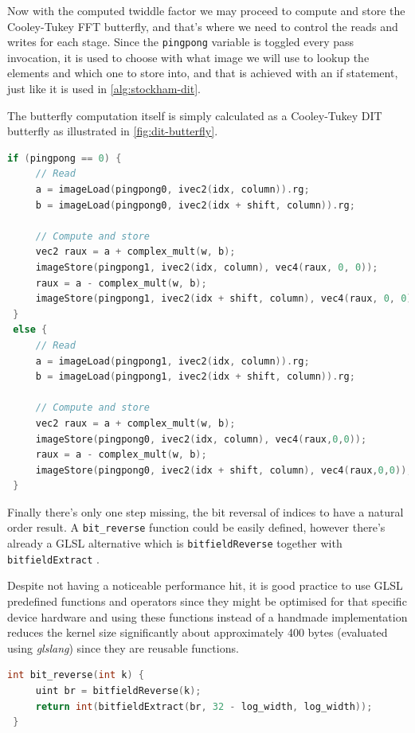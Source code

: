 \documentclass[
  oneside,
  11pt, a4paper,
  footinclude=true,
  headinclude=true,
  cleardoublepage=empty
]{scrbook}
\begin{document}
Now with the computed twiddle factor we may proceed to compute and store the Cooley-Tukey FFT butterfly, and that's where we need to control the reads and writes for each stage. Since the \texttt{pingpong} variable is toggled every pass invocation, it is used to choose with what image we will use to lookup the elements and which one to store into, and that is achieved with an if statement, just like it is used in \autoref{alg:stockham-dit}.

The butterfly computation itself is simply calculated as a Cooley-Tukey DIT butterfly as illustrated in \autoref{fig:dit-butterfly}.

\begin{lstlisting}[language=C,label={Computation of the Cooley-Tukey butterfly}]
 if (pingpong == 0) {
     // Read
     a = imageLoad(pingpong0, ivec2(idx, column)).rg;
     b = imageLoad(pingpong0, ivec2(idx + shift, column)).rg;

     // Compute and store
     vec2 raux = a + complex_mult(w, b);
     imageStore(pingpong1, ivec2(idx, column), vec4(raux, 0, 0));
     raux = a - complex_mult(w, b);
     imageStore(pingpong1, ivec2(idx + shift, column), vec4(raux, 0, 0));
 }
 else {
     // Read
     a = imageLoad(pingpong1, ivec2(idx, column)).rg;
     b = imageLoad(pingpong1, ivec2(idx + shift, column)).rg;
     
     // Compute and store
     vec2 raux = a + complex_mult(w, b);
     imageStore(pingpong0, ivec2(idx, column), vec4(raux,0,0));    
     raux = a - complex_mult(w, b);
     imageStore(pingpong0, ivec2(idx + shift, column), vec4(raux,0,0));
 }
\end{lstlisting}

Finally there's only one step missing, the bit reversal of indices to have a natural order result. A \texttt{bit\_reverse} function could be easily defined, however there's already a GLSL alternative which is \texttt{bitfieldReverse} together with \texttt{bitfieldExtract} \cite{kessenich4opengl}.

Despite not having a noticeable performance hit, it is good practice to use GLSL predefined functions and operators since they might be optimised for that specific device hardware and using these functions instead of a handmade implementation reduces the kernel size significantly about approximately 400 bytes (evaluated using \textit{glslang}) since they are reusable functions. 

\begin{lstlisting}[language=C,label={Auxiliary function that take advantage of GLSL's predefined utilities}]
 int bit_reverse(int k) {
     uint br = bitfieldReverse(k);
     return int(bitfieldExtract(br, 32 - log_width, log_width));
 }
\end{lstlisting}
\end{document}
